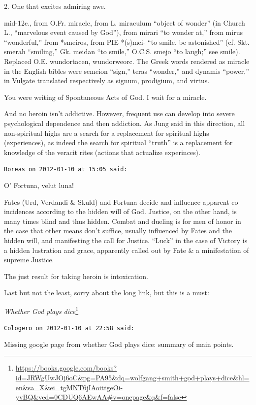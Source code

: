 \begin{footnotesize}
\begin{sffamily}
2. One that excites admiring awe.

mid-12c., from O.Fr. miracle, from L. miraculum ``object of wonder'' (in Church L., ``marvelous event caused by God''), from mirari ``to wonder at,'' from mirus ``wonderful,'' from *smeiros, from PIE *(s)mei- ``to smile, be astonished'' (cf. Skt. smerah ``smiling,'' Gk. meidan ``to smile,'' O.C.S. smejo ``to laugh;'' see smile). Replaced O.E. wundortacen, wundorweorc. The Greek words rendered as miracle in the English bibles were semeion ``sign,'' teras ``wonder,'' and dynamis ``power,'' in Vulgate translated respectively as signum, prodigium, and virtus.

You were writing of Spontaneous Acts of God. I wait for a miracle.

And no heroin isn't addictive. However, frequent use can develop into severe psychological dependence and then addiction. As Jung said in this direction, all non-spiritual highs are a search for a replacement for spiritual highs (experiences), as indeed the search for spiritual ``truth'' is a replacement for knowledge of the veracit rites (actions that actualize experinces).

\hfill

\texttt{Boreas on 2012-01-10 at 15:05 said:}

O' Fortuna, velut luna!

Fates (Urd, Verdandi \& Skuld) and Fortuna decide and influence apparent co-incidences according to the hidden will of God. Justice, on the other hand, is many times blind and thus hidden. Combat and dueling is for men of honor in the case that other means don't suffice, usually influenced by Fates and the hidden will, and manifesting the call for Justice. ``Luck'' in the case of Victory is a hidden lustration and grace, apparently called out by Fate \& a minifestation of supreme Justice.

The just result for taking heroin is intoxication.

Last but not the least, sorry about the long link, but this is a must:

\textit{Whether God plays dice}\footnote{\url{https://books.google.com/books?id=JRWgUwJOj6oC&pg=PA95&dq=wolfgang+smith+god+plays+dice&hl=en&sa=X&ei=tgMNT6jIAoittgeOi-yvBQ&ved=0CDUQ6AEwAA\#v=onepage&q&f=false}}

\hfill

\texttt{Cologero on 2012-01-10 at 22:58 said:}

Missing google page from whether God plays dice: summary of main points.


\end{sffamily}
\end{footnotesize}
